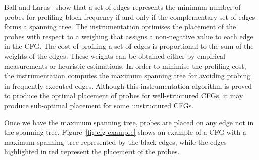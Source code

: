 \documentclass[sigplan,10pt]{acmart}
\theoremstyle{definition}
\begin{document}
Ball and Larus~\cite{ball94} show that a set of edges represents the minimum number of probes for profiling block frequency if and only if the complementary set of edges forms a spanning tree.
The instrumentation optimises the placement of the probes with respect to a weighing that assigns a non-negative value to each edge in the CFG.
The cost of profiling a set of edges is proportional to the sum of the weights of the edges.
These weights can be obtained either by empirical measurements or heuristic estimations.
In order to minimise the profiling cost, the instrumentation computes the maximum spanning tree for avoiding probing in frequently executed edges.
Although this instrumentation algorithm is proved to produce the optimal placement of probes for well-structured CFGs, it may produce sub-optimal placement for some unstructured CFGs.

Once we have the maximum spanning tree, probes are placed on any edge not in the spanning tree. Figure~\ref{fig:cfg-example} shows an example of a CFG with a maximum spanning tree represented by the black edges, while the edges highlighted in red represent the placement of the probes.
\end{document}
